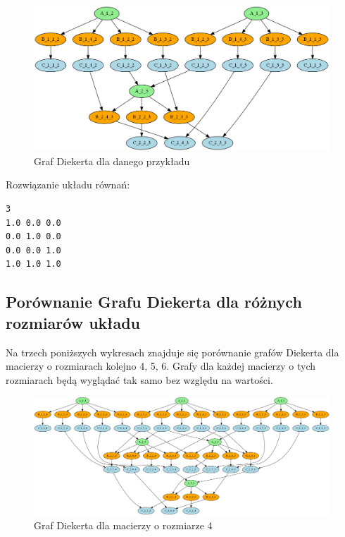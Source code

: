 \documentclass{article}
\begin{document}
\begin{figure}[H]
  \centering
    \includegraphics[width=0.99\textwidth]{images/diekert_graph_ex_3.png}
  \caption{Graf Diekerta dla danego przykładu}
\end{figure}

\noindent
Rozwiązanie układu równań:
\begin{verbatim}
3
1.0 0.0 0.0 
0.0 1.0 0.0 
0.0 0.0 1.0 
1.0 1.0 1.0 
\end{verbatim}

\newpage

\subsection{Porównanie Grafu Diekerta dla różnych rozmiarów układu}

Na trzech poniższych wykresach znajduje się porównanie grafów Diekerta dla macierzy
o rozmiarach kolejno 4, 5, 6. Grafy dla każdej macierzy o tych rozmiarach będą wyglądać
tak samo bez względu na wartości.

\begin{figure}[H]
  \centering
    \includegraphics[width=0.99\textwidth]{images/diekert_graph_ex_4.png}
  \caption{Graf Diekerta dla macierzy o rozmiarze 4}
\end{figure}
\end{document}
